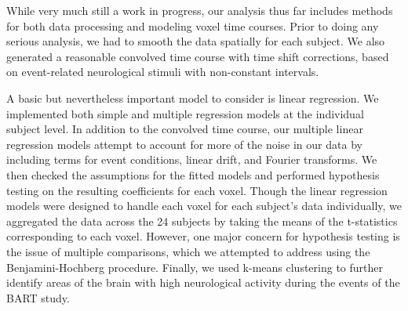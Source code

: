 \par \indent While very much still a work in progress, our analysis thus far 
includes methods for both data processing and modeling voxel time courses. 
Prior to doing any serious analysis, we had to smooth the data spatially for 
each subject. We also generated a reasonable convolved time course with time 
shift corrections, based on event-related neurological stimuli with 
non-constant intervals. 

\par A basic but nevertheless important model to consider is linear regression. 
We implemented both simple and multiple regression models at the individual 
subject level. In addition to the convolved time course, our multiple linear 
regression models attempt to account for more of the noise in our data by 
including terms for event conditions, linear drift, and Fourier transforms. 
We then checked the assumptions for the fitted models and performed hypothesis 
testing on the resulting coefficients for each voxel. Though the linear 
regression models were designed to handle each voxel for each subject's data 
individually, we aggregated the data across the 24 subjects by taking the means 
of the t-statistics corresponding to each voxel. However, one major concern for 
hypothesis testing is the issue of multiple comparisons, which we attempted to 
address using the Benjamini-Hochberg procedure. Finally, we used k-means 
clustering to further identify areas of the brain with high neurological 
activity during the events of the BART study. 



